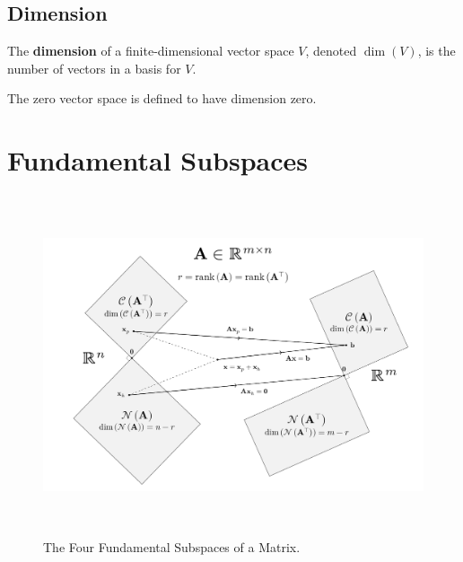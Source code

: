 \documentclass{article}
\begin{document}
\subsection{Dimension}
\begin{definition}
    The \textbf{dimension} of a finite-dimensional vector space \(V\),
    denoted \(\dim{\left( V \right)}\), is the number of vectors in a
    basis for \(V\).
\end{definition}
\begin{theorem}
    The zero vector space is defined to have dimension zero.
\end{theorem}
\section{Fundamental Subspaces}
\begin{figure}[H]
    \centering
    \includegraphics[height=10cm, keepaspectratio]{figures/fundamental_subspaces.pdf}
    \caption{The Four Fundamental Subspaces of a Matrix.}
\end{figure}
\end{document}
